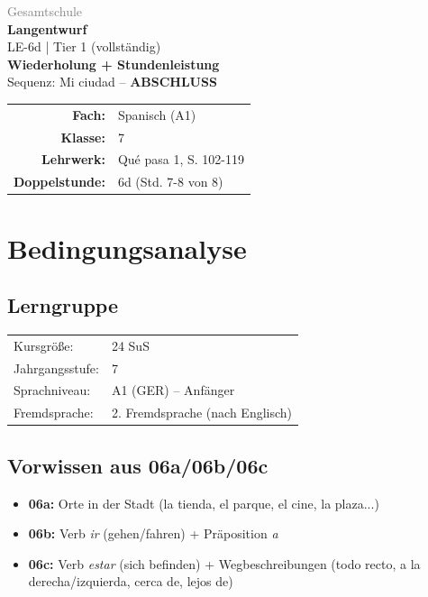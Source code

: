 \documentclass[11pt,a4paper]{article}
\newcommand{\fach}{Spanisch}
\newcommand{\jahrgangsstufe}{7}
\newcommand{\schulart}{Gesamtschule}
\newcommand{\stundenthema}{Wiederholung + Stundenleistung}
\newcommand{\reihenthema}{Mi ciudad}
\newcommand{\stundennummer}{6d}
\newcommand{\lehrwerk}{Qué pasa 1}
\newcommand{\lehrwerkseite}{S. 102-119}
\newcommand{\lerngruppengroesse}{24}
\begin{document}
\begin{titlepage}
    \centering
    \vspace*{2cm}
    {\large\textcolor{gray}{\schulart}}\\[2cm]
    {\Huge\textcolor{fach}{\textbf{Langentwurf}}}\\[0.5cm]
    {\large LE-\stundennummer{} | Tier 1 (vollständig)}\\[2cm]
    {\LARGE\textbf{\stundenthema}}\\[0.5cm]
    {\large Sequenz: \reihenthema{} -- \textbf{ABSCHLUSS}}\\[2cm]
    \begin{tabular}{rl}
        \textbf{Fach:} & \fach{} (A1) \\[0.3cm]
        \textbf{Klasse:} & \jahrgangsstufe \\[0.3cm]
        \textbf{Lehrwerk:} & \lehrwerk, \lehrwerkseite \\[0.3cm]
        \textbf{Doppelstunde:} & \stundennummer{} (Std. 7-8 von 8) \\[0.3cm]
    \end{tabular}
    \vfill
\end{titlepage}

\tableofcontents
\newpage

\section{Bedingungsanalyse}

\subsection{Lerngruppe}
\begin{tabular}{ll}
    Kursgröße: & \lerngruppengroesse{} SuS \\
    Jahrgangsstufe: & \jahrgangsstufe \\
    Sprachniveau: & A1 (GER) -- Anfänger \\
    Fremdsprache: & 2. Fremdsprache (nach Englisch) \\
\end{tabular}

\subsection{Vorwissen aus 06a/06b/06c}
\begin{itemize}
    \item \textbf{06a:} Orte in der Stadt (la tienda, el parque, el cine, la plaza...)
    \item \textbf{06b:} Verb \textit{ir} (gehen/fahren) + Präposition \textit{a}
    \item \textbf{06c:} Verb \textit{estar} (sich befinden) + Wegbeschreibungen (todo recto, a la derecha/izquierda, cerca de, lejos de)
\end{itemize}
\end{document}
